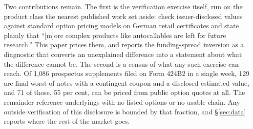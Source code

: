 Two contributions remain. The first is the verification exercise itself, run on
the product class the nearest published work set aside: \citet{Bauer2020} check
issuer-disclosed values against standard option pricing models on German retail
certificates and state plainly that ``[m]ore complex products like
autocallables are left for future research.'' This paper prices them, and
reports the funding-spread inversion as a diagnostic that converts an
unexplained difference into a statement about what the difference cannot be.
The second is a census of what any such exercise can reach. Of 1{,}086
prospectus supplements filed on Form 424B2 in a single week, 129 are final
worst-of notes with a contingent coupon and a disclosed estimated value, and 71
of those, 55 per cent, can be priced from public option quotes at all. The
remainder reference underlyings with no listed options or no usable chain. Any
outside verification of this disclosure is bounded by that fraction, and
\S\ref{sec:data} reports where the rest of the market goes.
